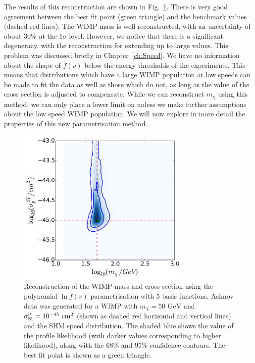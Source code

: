 The results of this reconstruction are shown in Fig.~\ref{fig:Poly:2D}. There is very good agreement between the best fit point (green triangle) and the benchmark values (dashed red lines). The WIMP mass is well reconstructed, with an uncertainty of about 30\% at the $1\sigma$ level. However, we notice that there is a significant degeneracy, with the reconstruction for \sigmapsi extending up to large values. This problem was discussed briefly in Chapter~\ref{ch:Speed}. We have no information about the shape of $f(v)$ below the energy thresholds of the experiments. This means that distributions which have a large WIMP population at low speeds can be made to fit the data as well as those which do not, as long as the value of the cross section is adjusted to compensate. While we can reconstruct $m_\chi$ using this method, we can only place a lower limit on \sigmapsi unless we make further assumptions about the low speed WIMP population. We will now explore in more detail the properties of this new parametrisation method.

\begin{figure}[t]
\centering
  \includegraphics[width=0.75\textwidth]{Poly/SHM_50_ASIMOV.pdf}
  \caption[Reconstruction of the WIMP mass and cross section using the polynomial $\ln f(v)$ parametrisation]{Reconstruction of the WIMP mass and cross section using the polynomial $\ln f(v)$ parametrisation with 5 basis functions. Asimov data was generated for a WIMP with $m_\chi = 50 \textrm{ GeV}$ and $\sigmapsi = 10^{-45} \cmsq$ (shown as dashed red horizontal and vertical lines) and the SHM speed distribution. The shaded blue shows the value of the profile likelihood (with darker values corresponding to higher likelihood), along with the 68\% and 95\% confidence contours. The best fit point is shown as a green triangle.}
  \label{fig:Poly:2D}
\end{figure}


